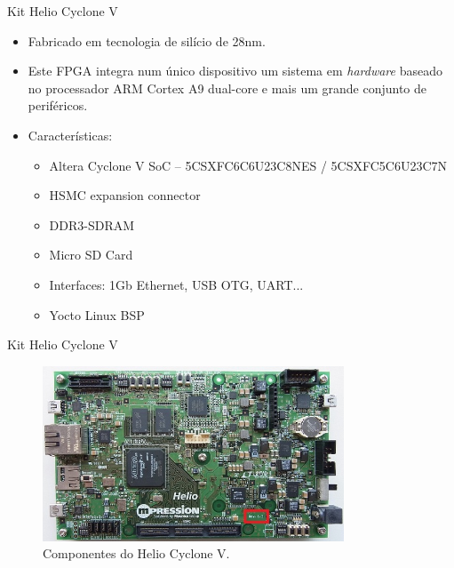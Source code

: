 	\begin{frame}{Kit Helio Cyclone V}
		\begin{itemize}
			\setlength\itemsep{1em}
			\item Fabricado em tecnologia de silício de 28nm.

			\item Este FPGA integra num único dispositivo um sistema em \textit{hardware} baseado no processador ARM Cortex A9 dual-core e mais um grande conjunto de periféricos.

			\item Características:
			\begin{itemize}
				\setlength\itemsep{0.4em}
				\item Altera Cyclone V SoC -- 5CSXFC6C6U23C8NES / 5CSXFC5C6U23C7N
				\item HSMC expansion connector
				\item DDR3-SDRAM
				\item Micro SD Card
				\item Interfaces: 1Gb Ethernet, USB OTG, UART...
				\item Yocto Linux BSP
			\end{itemize}
		\end{itemize}
	\end{frame}

	\begin{frame}{Kit Helio Cyclone V}
        \vspace{-1em}
		\begin{figure}[h]
			\centering
			\includegraphics[width=0.8\textwidth]{img/imobilis/helio-foto.jpg}
			\caption{Componentes do Helio Cyclone V.}
			\label{fig:helio-foto}
		\end{figure}
	\end{frame}


